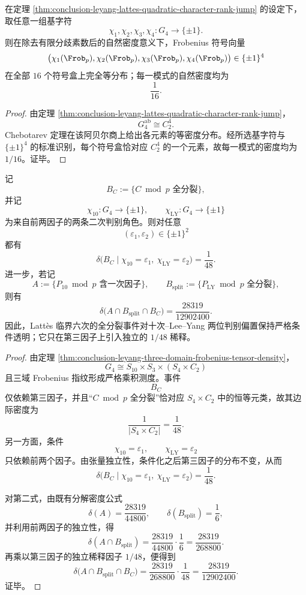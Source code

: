 \begin{corollary}[四比特判别立方体的完全等分布]\label{cor:conclusion-leyang-lattes-fourbit-signcube-equidistribution}
在定理 \ref{thm:conclusion-leyang-lattes-quadratic-character-rank-jump} 的设定下，取任意一组基字符
\[
\chi_1,\chi_2,\chi_3,\chi_4:G_4\to\{\pm1\}.
\]
则在除去有限分歧素数后的自然密度意义下，Frobenius 符号向量
\[
\bigl(\chi_1(\Frob_p),\chi_2(\Frob_p),\chi_3(\Frob_p),\chi_4(\Frob_p)\bigr)\in\{\pm1\}^4
\]
在全部 \(16\) 个符号盒上完全等分布；每一模式的自然密度均为
\[
\frac1{16}.
\]
\end{corollary}
\begin{proof}
由定理 \ref{thm:conclusion-leyang-lattes-quadratic-character-rank-jump}，
\[
G_4^{\mathrm{ab}}\cong C_2^4.
\]
Chebotarev 定理在该阿贝尔商上给出各元素的等密度分布。经所选基字符与 \(\{\pm1\}^4\) 的标准识别，每个符号盒恰对应 \(C_2^4\) 的一个元素，故每一模式的密度均为 \(1/16\)。证毕。
\end{proof}

\begin{theorem}\label{thm:conclusion-leyang-lattes-fullsplit-conditional-transparency}
记
\[
B_C:=\{\text{\(C\bmod p\) 全分裂}\},
\]
并记
\[
\chi_{10}:G_4\to\{\pm1\},
\qquad
\chi_{\mathrm{LY}}:G_4\to\{\pm1\}
\]
为来自前两因子的两条二次判别角色。则对任意
\[
(\varepsilon_1,\varepsilon_2)\in\{\pm1\}^2
\]
都有
\[
\delta\bigl(B_C\mid \chi_{10}=\varepsilon_1,\ \chi_{\mathrm{LY}}=\varepsilon_2\bigr)=\frac1{48}.
\]
进一步，若记
\[
A:=\{\text{\(P_{10}\bmod p\) 含一次因子}\},
\qquad
B_{\mathrm{split}}:=\{\text{\(P_{\mathrm{LY}}\bmod p\) 全分裂}\},
\]
则有
\[
\delta\bigl(A\cap B_{\mathrm{split}}\cap B_C\bigr)
=
\frac{28319}{12902400}.
\]
因此，Latt\`es 临界六次的全分裂事件对十次--Lee--Yang 两位判别偏置保持严格条件透明；它只在第三因子上引入独立的 \(1/48\) 稀释。
\end{theorem}
\begin{proof}
由定理 \ref{thm:conclusion-leyang-three-domain-frobenius-tensor-density}，
\[
G_4\cong S_{10}\times S_3\times (S_4\times C_2)
\]
且三域 Frobenius 指纹形成严格乘积测度。事件
\[
B_C
\]
仅依赖第三因子，并且“\(C\bmod p\) 全分裂”恰对应 \(S_4\times C_2\) 中的恒等元类，故其边际密度为
\[
\frac1{|S_4\times C_2|}=\frac1{48}.
\]
另一方面，条件
\[
\chi_{10}=\varepsilon_1,\qquad \chi_{\mathrm{LY}}=\varepsilon_2
\]
只依赖前两个因子。由张量独立性，条件化之后第三因子的分布不变，从而
\[
\delta\bigl(B_C\mid \chi_{10}=\varepsilon_1,\ \chi_{\mathrm{LY}}=\varepsilon_2\bigr)=\frac1{48}.
\]

对第二式，由既有分解密度公式
\[
\delta(A)=\frac{28319}{44800},
\qquad
\delta(B_{\mathrm{split}})=\frac16,
\]
并利用前两因子的独立性，得
\[
\delta(A\cap B_{\mathrm{split}})
=
\frac{28319}{44800}\cdot \frac16
=
\frac{28319}{268800}.
\]
再乘以第三因子的独立稀释因子 \(1/48\)，便得到
\[
\delta\bigl(A\cap B_{\mathrm{split}}\cap B_C\bigr)
=
\frac{28319}{268800}\cdot\frac1{48}
=
\frac{28319}{12902400}.
\]
证毕。
\end{proof}


